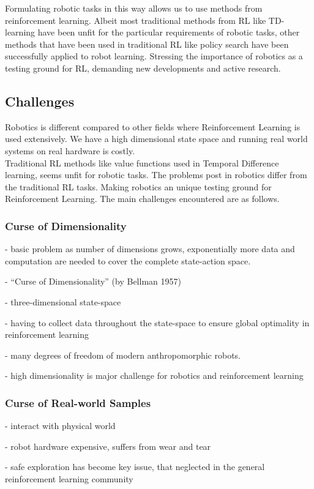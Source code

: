 Formulating robotic tasks in this way allows us to use methods from
reinforcement learning. Albeit most traditional methods from RL like
TD-learning \cite{sutton2018reinforcement}
have been unfit for the particular requirements of robotic tasks, other
methods that have been used in traditional RL like policy search have
been successfully applied to robot learning.
Stressing the importance of robotics as a testing ground for RL,
demanding new developments and active research.

\subsection{Challenges}
Robotics is different compared to other fields where Reinforcement Learning
is used extensively. We have a high dimensional state space and running
real world systems on real hardware is costly. \\
Traditional RL methods like value functions used in Temporal Difference learning,
seems unfit for robotic tasks. The problems post in robotics differ from
the traditional RL tasks.
Making robotics an unique testing ground for Reinforcement Learning.
The main challenges encountered are as follows.

\subsubsection{Curse of Dimensionality}
- basic problem as number of dimensions grows, exponentially more data and
computation are needed to cover the complete state-action space.

- ``Curse of Dimensionality'' (by Bellman 1957)

- three-dimensional state-space

- having to collect data throughout the state-space to ensure global optimality
in reinforcement learning

- many degrees of freedom of modern anthropomorphic robots.

- high dimensionality is major challenge for robotics and reinforcement learning

\subsubsection{Curse of Real-world Samples}
- interact with physical world

- robot hardware expensive, suffers from wear and tear

- safe exploration has become key issue, that neglected in the
general reinforcement learning community

